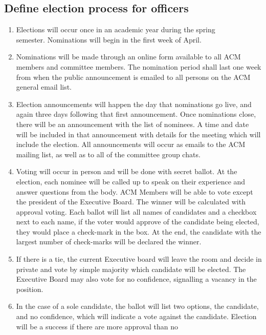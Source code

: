   \subsection{Define election process for officers}
    \begin{enumerate}[label=\arabic*.]
      \item Elections will occur once in an academic year during the spring\\
      semester. Nominations will begin in the first week of April.
      \item Nominations will be made through an online form available to all ACM
      members and committee members. The nomination period shall last one week
      from when the public announcement is emailed to all persons on the ACM
      general email list.
      \item Election announcements will happen the day that nominations go live,
      and again three days following that first announcement. Once nominations
      close, there will be an announcement with the list of nominees. A time and
      date will be included in that announcement with details for the meeting
      which will include the election. All announcements will occur as emails to
      the ACM mailing list, as well as to all of the committee group chats.
      \item Voting will occur in person and will be done with secret ballot. At
      the election, each nominee will be called up to speak on their experience
      and answer questions from the body. ACM Members will be able to vote
      except the president of the Executive Board. The winner will be calculated
      with approval voting. Each ballot will list all names of candidates and a
      checkbox next to each name, if the voter would approve of the candidate
      being elected, they would place a check-mark in the box. At the end, the
      candidate with the largest number of check-marks will be declared the
      winner.
      \item If there is a tie, the current Executive board will leave the room
      and decide in private and vote by simple majority which candidate will be
      elected. The Executive Board may also vote for no confidence, signalling a
      vacancy in the position.
      \item In the case of a sole candidate, the ballot will list two options,
      the candidate, and no confidence, which will indicate a vote against the
      candidate. Election will be a success if there are more approval than no

\end{enumerate}
